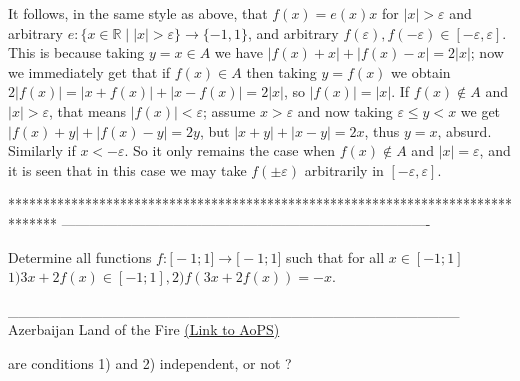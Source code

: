 \begin{solution}
	It follows, in the same style as above, that $f(x) = e(x)x$ for $|x| > \varepsilon$ and arbitrary $e: \{x \in \mathbb{R} \mid |x| > \varepsilon\}\to \{-1,1\}$, and arbitrary $f(\varepsilon), f(-\varepsilon) \in [-\varepsilon,\varepsilon]$.
This is because taking $y=x\in A$ we have $|f(x)+x| + |f(x)-x| = 2|x|$; now we immediately get that if $f(x) \in A$ then taking $y=f(x)$ we obtain $2|f(x)| = |x+f(x)| + |x-f(x)| = 2|x|$, so $|f(x)| = |x|$. 
If $f(x)\not \in A$ and $|x| > \varepsilon$, that means $|f(x)| < \varepsilon$; assume $x > \varepsilon$ and now taking $\varepsilon \leq y < x$ we get $|f(x)+y| + |f(x)-y| = 2y$, but $|x+y| + |x-y| = 2x$, thus $y=x$, absurd. Similarly if $x < -\varepsilon$.
So it only remains the case when $f(x)\not \in A$ and $|x| = \varepsilon$, and it is seen that in this case we may take $f(\pm \varepsilon)$ arbitrarily in  $[-\varepsilon,\varepsilon]$.
\end{solution}
*******************************************************************************
-------------------------------------------------------------------------------

\begin{problem}
	Determine all functions $f: \mathbb[-1;1]\to\mathbb[-1;1]$ such that for all $x\in[-1;1]$
$1)3x+2f(x)\in[-1;1] ,2)f(3x+2f(x))=-x$.


___________________________________________
Azerbaijan Land of the Fire 
	\flushright \href{https://artofproblemsolving.com/community/c6h490124}{(Link to AoPS)}
\end{problem}



\begin{solution}
	are conditions 1) and 2) independent, or not ?
\end{solution}



